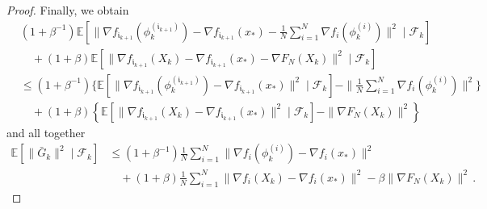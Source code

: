 \documentclass[12pt,openany]{book}
\theoremstyle{definition}
\theoremstyle{definition}
\newcommand{\cF}{\mathcal{F}}
\newcommand{\E}{\mathbb{E}}
\begin{document}
\begin{proof}
Finally, we obtain
\begin{align*}
&(1+\beta^{-1}) \E[\|\nabla f_{\mathfrak i_{k+1}}(\phi_k^{(\mathfrak i_{k+1})}) - \nabla f_{\mathfrak i_{k+1}}(x_\ast)-\frac1N\sum_{i=1}^N \nabla f_i(\phi_k^{(i)})\|^2\mid\cF_k]\\ &\quad+(1+\beta)\E[\|\nabla f_{\mathfrak i_{k+1}}(X_k) - \nabla f_{\mathfrak i_{k+1}}(x_\ast) - \nabla F_N(X_k)\|^2\mid\cF_k]\\
&\le (1+\beta^{-1})\Big\{\E[\|\nabla f_{\mathfrak i_{k+1}}(\phi_k^{(\mathfrak i_{k+1})}) - \nabla f_{\mathfrak i_{k+1}}(x_\ast)\|^2\mid\cF_k]-\|\frac1N\sum_{i=1}^N \nabla f_i(\phi_k^{(i)})\|^2 \Big\}\\
&\quad+ (1+\beta)\left\{\E[\|\nabla f_{\mathfrak i_{k+1}}(X_k) - \nabla f_{\mathfrak i_{k+1}}(x_\ast)\|^2 \mid\cF_k]- \|\nabla F_N(X_k)\|^2 \right\}
\end{align*}
and all together
\begin{align*}
\E[\|\bar G_k\|^2\mid \cF_k] &\le (1+\beta^{-1}) \frac1N\sum_{i=1}^N \|\nabla f_i(\phi_k^{(i)})-\nabla f_i(x_\ast)\|^2\\&\quad + (1+\beta) \frac{1}{N}\sum_{i=1}^N \|\nabla f_i(X_k)-\nabla f_i(x_\ast)\|^2 - \beta\|\nabla F_N(X_k)\|^2\,.
\end{align*}
\end{proof}
\end{document}
